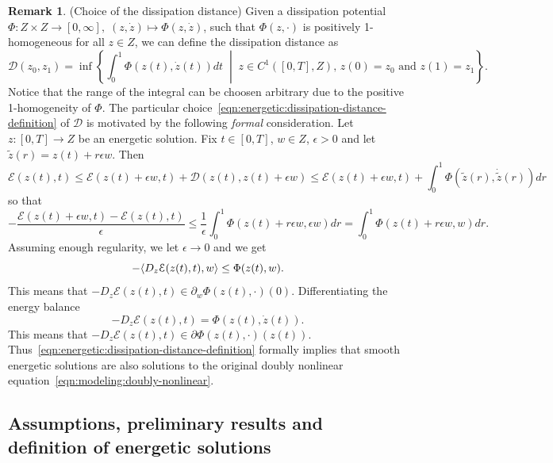 \documentclass[a4paper,10pt,oneside]{amsbook}
\numberwithin{section}{chapter}
\numberwithin{equation}{chapter}
\theoremstyle{definition}
\newtheorem{rmk}[prop]{Remark}
\DeclarePairedDelimiter{\dual}{\langle}{\rangle}
\begin{document}
\begin{rmk}(Choice of the dissipation distance)
\label{rmk:minimum-dissipation}
Given a dissipation potential $\Phi\colon Z\times Z\to[0,\infty],\;(z,\dot z)\mapsto\Phi(z,\dot z)$, such that $\Phi(z,\cdot)$ is positively 1-homogeneous for all $z\in Z$, we can define the dissipation distance as
\begin{equation}
\label{eqn:energetic:dissipation-distance-definition}
\mathcal{D}(z_0,z_1)=\inf\left\{\int_0^1\Phi(z(t),\dot{z}(t))dt\;\middle|\;\text{$z\in C^1([0,T],Z)$, $z(0)=z_0$ and $z(1)=z_1$}\right\}.
\end{equation}
Notice that the range of the integral can be choosen arbitrary due to the positive 1-homogeneity of $\Phi$. The particular choice~\eqref{eqn:energetic:dissipation-distance-definition} of $\mathcal{D}$ is motivated by the following \emph{formal} consideration. Let $z\colon[0,T]\to Z$ be an energetic solution. Fix $t\in[0,T]$, $w\in Z$, $\epsilon>0$ and let $\tilde z(r)=z(t)+r\epsilon w$. Then
\[
\mathcal{E}(z(t),t)\le\mathcal{E}(z(t)+\epsilon w,t)+\mathcal{D}(z(t),z(t)+\epsilon w)\le\mathcal{E}(z(t)+\epsilon w,t)+\int_0^1\Phi(\tilde z(r),\dot{\tilde z}(r))dr
\]
so that
\[
-\frac{\mathcal{E}(z(t)+\epsilon w,t)-\mathcal{E}(z(t),t)}{\epsilon}\le\frac{1}{\epsilon}\int_0^1\Phi(z(t)+r\epsilon w,\epsilon w)dr=\int_0^1\Phi(z(t)+r\epsilon w,w)dr.
\]
Assuming enough regularity, we let $\epsilon\to 0$ and we get
\[
-\dual{D_z\mathcal{E}(z(t),t),w}\le\Phi(z(t),w).
\]
This means that $-D_z\mathcal{E}(z(t),t)\in\partial_w\Phi(z(t),\cdot)(0)$. Differentiating the energy balance
\[
-D_z\mathcal{E}(z(t),t)=\Phi(z(t),\dot{z}(t)).
\]
This means that $-D_z\mathcal{E}(z(t),t)\in\partial\Phi(z(t),\cdot)(z(t))$. Thus~\eqref{eqn:energetic:dissipation-distance-definition} formally implies that smooth energetic solutions are also solutions to the original doubly nonlinear equation~\ref{eqn:modeling:doubly-nonlinear}.
\end{rmk}

\subsection{Assumptions, preliminary results and definition of energetic solutions}
\label{subsec:assumptions-energetic}
\end{document}
